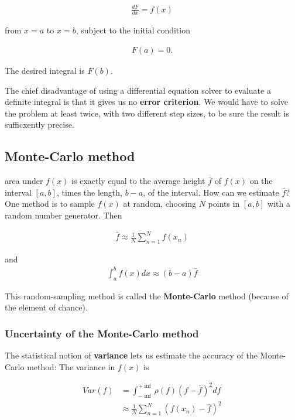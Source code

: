 \begin{align}
\frac{dF}{dx} = f(x)
\end{align}

from $x = a$ to $x = b$, subject to the initial condition

\begin{align}
F(a) = 0.
\end{align}

The desired integral is $F(b)$.

The chief disadvantage of using a differential equation solver to evaluate a definite integral is that it gives us no \textbf{error criterion}. We would have to solve the problem at least twice, with two different step sizes, to be sure the result is sufficxently precise.

\subsection{Monte-Carlo method}
 area under $f(x)$ is exactly equal to the average height $\bar{f}$ of $f(x)$ on the interval $[a, b]$, times the length, $b-a$, of the interval. How can we estimate $\bar{f}$? One method is to sample $f(x)$ at random, choosing $N$ points in $[a,b]$ with a random number generator. Then

\begin{align}
\bar{f} \approx \frac{1}{N} \sum_{n=1}^{N} f(x_n)
\end{align}

and
\begin{align}
\int_{a}^{b} f(x) dx \approx (b-a)\bar{f}
\end{align}

This random-sampling method is called the \textbf{Monte-Carlo} method (because of the element of chance).

\subsubsection{Uncertainty of the Monte-Carlo method}
The statistical notion of \textbf{variance} lets us estimate the accuracy of the Monte-Carlo method: The variance in $f(x)$ is

\begin{align}
Var(f) &= \int_{-\inf}^{+\inf} \rho(f) (f- \bar{f})^2 df \\
&\approx \frac{1}{N} \sum_{n=1}^{N} (f(x_n) - \bar{f})^2
\end{align}

